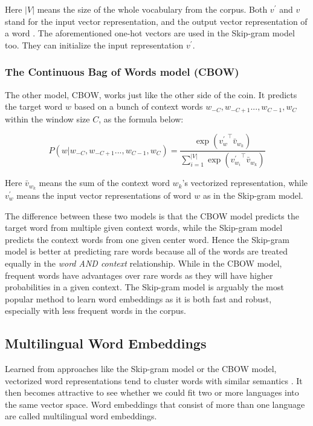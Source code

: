 \documentclass[thesis,fonts=libertine]{cluu}
\begin{document}
Here $|V|$ means the size of the whole vocabulary from the corpus. Both $v^\prime$ and $v$ stand for the input vector representation, and the output vector representation of a word \parencite{Mikolov:2013aa}. The aforementioned one-hot vectors are used in the Skip-gram model too. They can initialize the input representation $v^\prime$.

\subsubsection{The Continuous Bag of Words model (CBOW)}

The other model, CBOW, works just like the other side of the coin. It predicts the target word $w$ based on a bunch of context words $w_{-C}, w_{-C+1} ..., w_{C-1}, w_C$ within the window size $C$, as the formula below:

\begin{equation}
  P(w|w_{-C}, w_{-C+1} ..., w_{C-1}, w_C)=\frac{\exp({v^\prime_w}^\intercal \bar{v}_{w_k})}{\sum^{|V|}_{i=1}\exp({v^\prime_{w_i}}^\intercal \bar{v}_{w_k})}
\end{equation}

Here $\bar{v}_{w_k}$ means the sum of the context word $w_k$'s vectorized representation, while $v^\prime_w$ means the input vector representations of word $w$ as in the Skip-gram model.

The difference between these two models is that the CBOW model predicts the target word from multiple given context words, while the Skip-gram model predicts the context words from one given center word. Hence the Skip-gram model is better at predicting rare words because all of the words are treated equally in the \textit{word AND context} relationship. While in the CBOW model, frequent words have advantages over rare words as they will have higher probabilities in a given context. The Skip-gram model is arguably the most popular method to learn word embeddings as it is both fast and robust, especially with less frequent words in the corpus. \parencite{levy-etal-2015-improving}

\subsection{Multilingual Word Embeddings}
\label{sec:multilingual_word_embeddings}

Learned from approaches like the Skip-gram model or the CBOW model, vectorized word representations tend to cluster words with similar semantics \parencite{Mikolov:2013ac}. It then becomes attractive to see whether we could fit two or more languages into the same vector space. Word embeddings that consist of more than one language are called multilingual word embeddings.
\end{document}
